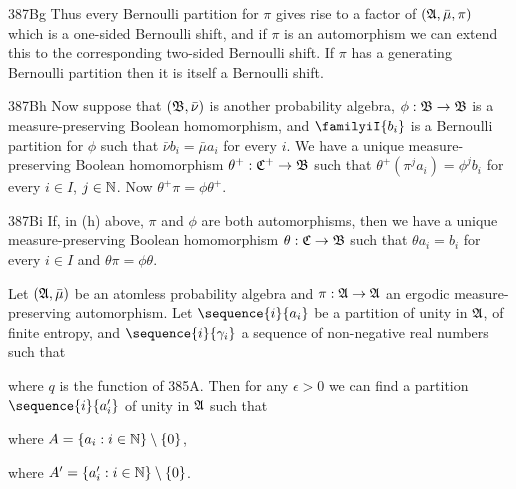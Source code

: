 \spheader 387Bg Thus every Bernoulli partition for $\pi$ gives rise
to a factor of $(\frak A,\bar\mu,\pi)$ which is a one-sided Bernoulli
shift, and if $\pi$ is an automorphism we can extend this to the
corresponding two-sided Bernoulli shift.   If
$\pi$ has a generating Bernoulli partition then it is itself a Bernoulli
shift.

\spheader 387Bh Now suppose that $(\frak B,\bar\nu)$ is another
probability algebra, $\phi:\frak B\to\frak B$ is a measure-preserving
Boolean homomorphism, and $\familyiI{b_i}$ is a Bernoulli partition for
$\phi$ such that $\bar\nu b_i=\bar\mu a_i$ for every $i$.   We have a
unique measure-preserving Boolean
homomorphism $\theta^+:\frak C^+\to\frak B$ such that
$\theta^+(\pi^ja_i)=\phi^jb_i$ for every $i\in I$, $j\in\Bbb N$.
   Now $\theta^+\pi=\phi\theta^+$.

\spheader 387Bi If, in (h) above, $\pi$ and $\phi$ are both
automorphisms, then we have a
unique measure-preserving Boolean homomorphism
$\theta:\frak C\to\frak B$ such that $\theta a_i=b_i$ for every $i\in I$
and $\theta\pi=\phi\theta$.

Let $(\frak A,\bar\mu)$ be an atomless probability algebra and
$\pi:\frak A\to\frak A$ an ergodic measure-preserving automorphism.
Let $\sequence{i}{a_i}$ be a partition of unity in $\frak A$, of finite
entropy, and $\sequence{i}{\gamma_i}$ a sequence of
non-negative real numbers such that


\noindent where $q$ is the function of 385A.   Then for any $\epsilon>0$
we can find a partition $\sequence{i}{a'_i}$ of unity in $\frak A$ such
that




\noindent where $A=\{a_i:i\in\Bbb N\}\setminus\{0\}$,


\noindent where $A'=\{a'_i:i\in\Bbb N\}\setminus\{0\}$.

